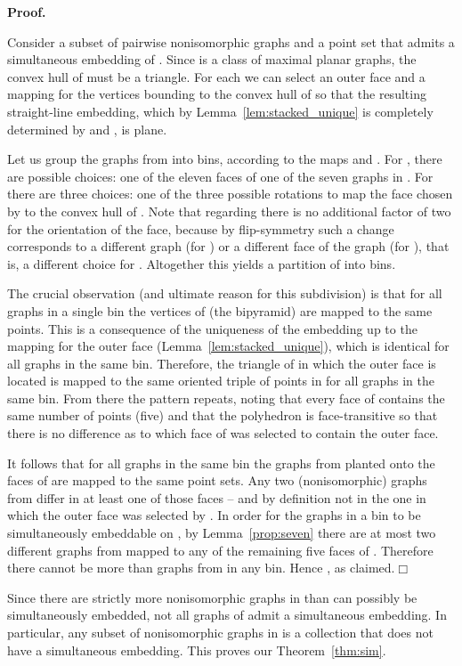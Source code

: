 \documentclass[11pt]{article}
\newcommand{\qed}{\hfill\ensuremath{\Box}}
\newenvironment{proof}{\noindent\textbf{Proof.}
}{\par\medskip}
\begin{document}
\begin{proof}
  Consider a subset  of pairwise
  nonisomorphic graphs and a point set  that admits a simultaneous embedding
  of . Since  is a class of maximal planar graphs,
  the convex hull of  must be a triangle. For each  we can
  select an outer face  and a mapping  for the vertices bounding
   to the convex hull of  so that the resulting straight-line
  embedding, which by Lemma~\ref{lem:stacked_unique} is completely determined by
   and , is plane.

  Let us group the graphs from  into bins, according to the maps
   and . For , there are  possible choices: one of the
  eleven faces of one of the seven graphs in . For  there are
  three choices: one of the three possible rotations to map the face chosen by
   to the convex hull of . Note that regarding  there is no
  additional factor of two for the orientation of the face, because by
  flip-symmetry such a change corresponds to a different graph (for
  ) or a different face of the graph (for ), that is, a
  different choice for . Altogether this yields a partition of 
  into  bins.

  The crucial observation (and ultimate reason for this subdivision) is that for
  all graphs in a single bin the vertices of  (the bipyramid) are mapped to
  the same points. This is a consequence of the uniqueness of the embedding up
  to the mapping for the outer face (Lemma~\ref{lem:stacked_unique}), which is
  identical for all graphs in the same bin. Therefore, the triangle  of 
  in which the outer face is located is mapped to the same oriented triple of
  points in  for all graphs in the same bin. From there the pattern repeats,
  noting that every face of  contains the same number of points (five) and
  that the polyhedron  is face-transitive so that there is no difference as
  to which face of  was selected to contain the outer face.

  It follows that for all graphs in the same bin the graphs from 
  planted onto the faces of  are mapped to the same point sets. Any two
  (nonisomorphic) graphs from  differ in at least one of those
  faces -- and by definition not in the one in which the outer face was selected
  by . In order for the graphs in a bin to be simultaneously embeddable on
  , by Lemma~\ref{prop:seven} there are at most two different graphs from
   mapped to any of the remaining five faces of . Therefore
  there cannot be more than  graphs from  in any bin.
  Hence , as claimed.\qed
\end{proof}
Since there are strictly more nonisomorphic graphs in  than can
possibly be simultaneously embedded, not all graphs of  admit a
simultaneous embedding.  In particular, any subset of  nonisomorphic
graphs in  is a collection that does not have a simultaneous
embedding. This proves our Theorem~\ref{thm:sim}.
\end{document}
